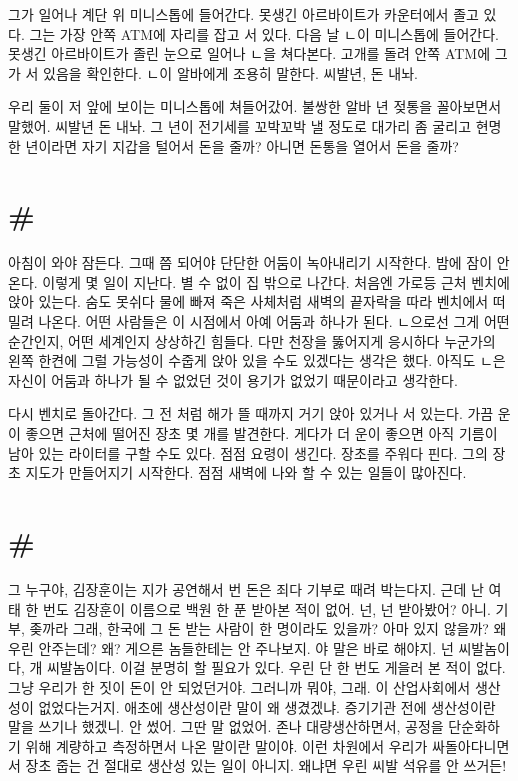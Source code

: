 \documentclass[a5paper,10pt, twoside, openright]{memoir}
\begin{document}
	그가 일어나 계단 위 미니스톱에 들어간다. 못생긴 아르바이트가 카운터에서 졸고 있다. 그는 가장 안쪽 ATM에 자리를 잡고 서 있다. 다음 날 ㄴ이 미니스톱에 들어간다. 못생긴 아르바이트가 졸린 눈으로 일어나 ㄴ을 쳐다본다. 고개를 돌려 안쪽 ATM에 그가 서 있음을 확인한다. ㄴ이 알바에게 조용히 말한다. 씨발년, 돈 내놔.

	우리 둘이 저 앞에 보이는 미니스톱에 쳐들어갔어. 불쌍한 알바 년 젖통을 꼴아보면서 말했어. 씨발년 돈 내놔. 그 년이 전기세를 꼬박꼬박 낼 정도로 대가리 좀 굴리고 현명한 년이라면 자기 지갑을 털어서 돈을 줄까? 아니면 돈통을 열어서 돈을 줄까? 

	\section{\#}
	아침이 와야 잠든다. 그때 쯤 되어야 단단한 어둠이 녹아내리기 시작한다. 밤에 잠이 안온다. 이렇게 몇 일이 지난다. 별 수 없이 집 밖으로 나간다. 처음엔 가로등 근처 벤치에 앉아 있는다. 숨도 못쉬다 물에 빠져 죽은 사체처럼 새벽의 끝자락을 따라 벤치에서 떠밀려 나온다. 어떤 사람들은 이 시점에서 아예 어둠과 하나가 된다. ㄴ으로선 그게 어떤 순간인지, 어떤 세계인지 상상하긴 힘들다. 다만 천장을 뚫어지게 응시하다 누군가의 왼쪽 한켠에 그럴 가능성이 수줍게 앉아 있을 수도 있겠다는 생각은 했다. 아직도 ㄴ은 자신이 어둠과 하나가 될 수 없었던 것이 용기가 없었기 때문이라고 생각한다. 

	다시 벤치로 돌아간다. 그 전 처럼 해가 뜰 때까지 거기 앉아 있거나 서 있는다. 가끔 운이 좋으면 근처에 떨어진 장초 몇 개를 발견한다. 게다가 더 운이 좋으면 아직 기름이 남아 있는 라이터를 구할 수도 있다. 점점 요령이 생긴다. 장초를 주워다 핀다. 그의 장초 지도가 만들어지기 시작한다. 점점 새벽에 나와 할 수 있는 일들이 많아진다.
	
	\section{\#}
	그 누구야, 김장훈이는 지가 공연해서 번 돈은 죄다 기부로 때려 박는다지. 근데 난 여태 한 번도 김장훈이 이름으로 백원 한 푼 받아본 적이 없어. 넌, 넌 받아봤어? 아니. 기부, 좆까라 그래, 한국에 그 돈 받는 사람이 한 명이라도 있을까? 아마 있지 않을까? 왜 우린 안주는데? 왜? 게으른 놈들한테는 안 주나보지. 야 말은 바로 해야지. 넌 씨발놈이다, 개 씨발놈이다. 이걸 분명히 할 필요가 있다. 우린 단 한 번도 게을러 본 적이 없다. 그냥 우리가 한 짓이 돈이 안 되었던거야. 그러니까 뭐야, 그래. 이 산업사회에서 생산성이 없었다는거지. 애초에 생산성이란 말이 왜 생겼겠냐. 증기기관 전에 생산성이란 말을 쓰기나 했겠니. 안 썼어. 그딴 말 없었어. 존나 대량생산하면서, 공정을 단순화하기 위해 계량하고 측정하면서 나온 말이란 말이야. 이런 차원에서 우리가 싸돌아다니면서 장초 줍는 건 절대로 생산성 있는 일이 아니지. 왜냐면 우린 씨발 석유를 안 쓰거든! 
\end{document}
